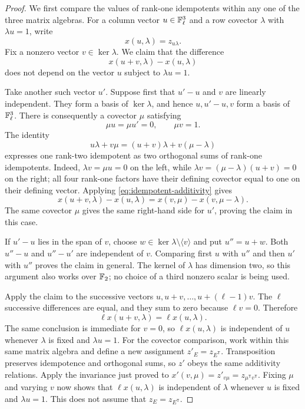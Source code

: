 \begin{proof}
We first compare the values of rank-one idempotents within any one of
the three matrix algebras.  For a column vector $u\in\mathbb F_\ell^3$ and a row
covector $\lambda$ with $\lambda u=1$, write
\[
 x(u,\lambda)=z_{u\lambda}.
\]
Fix a nonzero vector $v\in\ker\lambda$.  We claim that the difference
\begin{equation}\label{eq:fixed-increment}
 x(u+v,\lambda)-x(u,\lambda)
\end{equation}
does not depend on the vector $u$ subject to $\lambda u=1$.

Take another such vector $u'$.  Suppose first that $u'-u$ and $v$ are
linearly independent.  They form a basis of $\ker\lambda$, and hence
$u,u'-u,v$ form a basis of $\mathbb F_\ell^3$.  There is consequently a covector
$\mu$ satisfying
\[
 \mu u=\mu u'=0,\qquad \mu v=1.
\]
The identity
\[
 u\lambda+v\mu=(u+v)\lambda+v(\mu-\lambda)
\]
expresses one rank-two idempotent as two orthogonal sums of rank-one
idempotents.  Indeed, $\lambda v=\mu u=0$ on the left, while
$\lambda v=(\mu-\lambda)(u+v)=0$ on the right; all four rank-one
factors have their defining covector equal to one on their defining
vector.  Applying \eqref{eq:idempotent-additivity} gives
\begin{equation}\label{eq:rank-one-difference}
 x(u+v,\lambda)-x(u,\lambda)
   =x(v,\mu)-x(v,\mu-\lambda).
\end{equation}
The same covector $\mu$ gives the same right-hand side for $u'$, proving
the claim in this case.

If $u'-u$ lies in the span of $v$, choose
$w\in\ker\lambda\setminus\langle v\rangle$ and put $u''=u+w$.
Both $u''-u$ and $u''-u'$ are independent of $v$.  Comparing first $u$
with $u''$ and then $u'$ with $u''$ proves the claim in general.
The kernel of $\lambda$ has dimension two, so this argument also works
over $\mathbb F_2$; no choice of a third nonzero scalar is being used.

Apply the claim to the successive vectors
$u,u+v,\ldots,u+(\ell-1)v$.  The $\ell$ successive differences are
equal, and they sum to zero because $\ell v=0$.  Therefore
\begin{equation}\label{eq:rank-one-prime-invariance}
 \ell x(u+v,\lambda)=\ell x(u,\lambda).
\end{equation}
The same conclusion is immediate for $v=0$, so $\ell x(u,\lambda)$
is independent of $u$ whenever $\lambda$ is fixed and $\lambda u=1$.
For the covector comparison, work within this same matrix algebra
and define a new assignment $z'_E=z_{E^{\mathsf T}}$.
Transposition preserves idempotence and orthogonal sums, so $z'$ obeys
the same additivity relations.  Apply the invariance just proved to
$x'(v,\mu)=z'_{v\mu}=z_{\mu^{\mathsf T}v^{\mathsf T}}$.
Fixing $\mu$ and varying $v$ now shows that $\ell x(u,\lambda)$
is independent of $\lambda$ whenever $u$ is fixed and $\lambda u=1$.
This does not assume that $z_E=z_{E^{\mathsf T}}$.


\end{proof}
